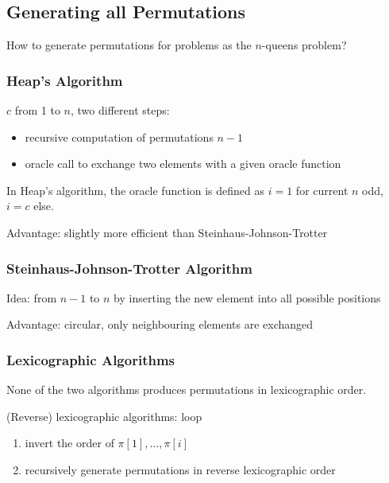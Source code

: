 \documentclass[11pt]{article}
\begin{document}
\subsection{Generating all Permutations}

How to generate permutations for problems as the $ n $-queens problem?

\subsubsection{Heap's Algorithm}

$ c $ from 1 to $ n $, two different steps:

\begin{itemize}
\item recursive computation of permutations $ n - 1 $
\item oracle call to exchange two elements with a given oracle function
\end{itemize}

In Heap's algorithm, the oracle function is defined as $ i = 1 $ for current $ n $ odd, $ i = c $ else. \newline

Advantage: slightly more efficient than Steinhaus-Johnson-Trotter

\subsubsection{Steinhaus-Johnson-Trotter Algorithm}

Idea: from $ n - 1 $ to $ n $ by inserting the new element into all possible positions \newline

Advantage: circular, only neighbouring elements are exchanged

\subsubsection{Lexicographic Algorithms}

None of the two algorithms produces permutations in lexicographic order.


(Reverse) lexicographic algorithms: loop
\begin{enumerate}
\item invert the order of $ \pi[1], \dots, \pi[i] $
\item recursively generate permutations in reverse lexicographic order
\end{enumerate}
\end{document}
